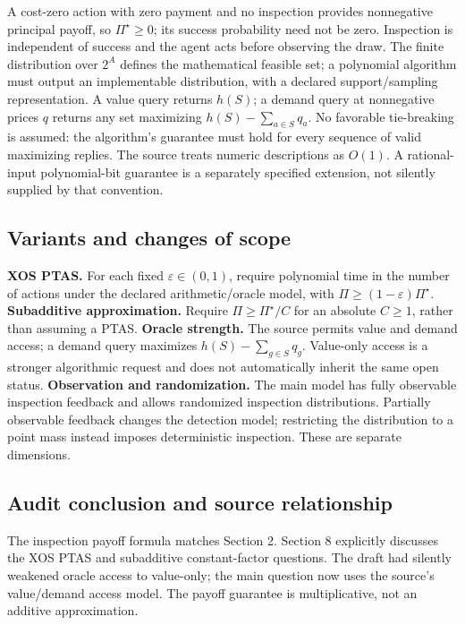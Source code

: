 \documentclass[11pt,a4paper]{article}
\begin{document}
A cost-zero action with zero payment and no inspection provides nonnegative principal payoff, so \(\Pi^\star\geq0\); its success probability need not be zero. Inspection is independent of success and the agent acts before observing the draw. The finite distribution over \(2^A\) defines the mathematical feasible set; a polynomial algorithm must output an implementable distribution, with a declared support/sampling representation. A value query returns \(h(S)\); a demand query at nonnegative prices \(q\) returns any set maximizing \(h(S)-\sum_{a\in S}q_a\). No favorable tie-breaking is assumed: the algorithm's guarantee must hold for every sequence of valid maximizing replies. The source treats numeric descriptions as \(O(1)\). A rational-input polynomial-bit guarantee is a separately specified extension, not silently supplied by that convention.

\subsection*{Variants and changes of scope}

\textbf{XOS PTAS.} For each fixed $\varepsilon\in(0,1)$, require polynomial time in the number of actions under the declared arithmetic/oracle model, with $\Pi\geq(1-\varepsilon)\Pi^\star$. \textbf{Subadditive approximation.} Require $\Pi\geq\Pi^\star/C$ for an absolute $C\geq1$, rather than assuming a PTAS. \textbf{Oracle strength.} The source permits value and demand access; a demand query maximizes $h(S)-\sum_{g\in S}q_g$. Value-only access is a stronger algorithmic request and does not automatically inherit the same open status. \textbf{Observation and randomization.} The main model has fully observable inspection feedback and allows randomized inspection distributions. Partially observable feedback changes the detection model; restricting the distribution to a point mass instead imposes deterministic inspection. These are separate dimensions.

\subsection*{Audit conclusion and source relationship}

The inspection payoff formula matches Section 2. Section 8 explicitly discusses the XOS PTAS and subadditive constant-factor questions. The draft had silently weakened oracle access to value-only; the main question now uses the source's value/demand access model. The payoff guarantee is multiplicative, not an additive approximation.
\end{document}
